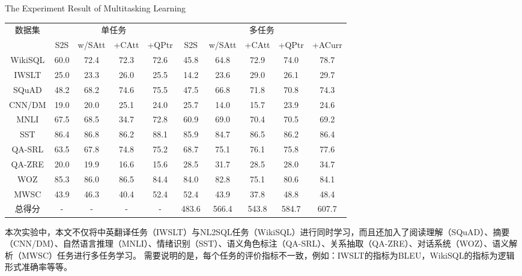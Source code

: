\begin{table}[!htpb]
    {The Experiment Result of Multitasking Learning}
  \label{tab:drwwldsyjg}
  \centering
  \begin{threeparttable}[b]
     \begin{tabular}{cccccccccc}
      \toprule
      \multirow{2}{18mm}{数据集}&\multicolumn{4}{c}{单任务} & \multicolumn{5}{c}{多任务}\\
      \cmidrule(lr){2-5}\cmidrule(lr){6-10}
      & S2S & w/SAtt & +CAtt & +QPtr & S2S & w/SAtt & +CAtt & +QPtr & +ACurr\\
      \midrule
      WikiSQL & 60.0 & 72.4 & 72.3 & 72.6 & 45.8 & 64.8 & 72.9 & 74.0 & 78.7\\
      IWSLT & 25.0 & 23.3 & 26.0 & 25.5 & 14.2 & 23.6 & 29.0 & 26.1 & 29.7\\
      SQuAD & 48.2 & 68.2 & 74.6 & 75.5 & 47.5 & 66.8 & 71.8 & 70.8 & 74.3\\
      CNN/DM & 19.0 & 20.0 & 25.1 & 24.0 & 25.7 & 14.0 & 15.7 & 23.9 & 24.6\\
      MNLI & 67.5 & 68.5 & 34.7 & 72.8 & 60.9 & 69.0 & 70.4 & 70.5 & 69.2\\
      SST & 86.4 & 86.8 & 86.2 & 88.1 & 85.9 & 84.7 & 86.5 & 86.2 & 86.4\\
      QA-SRL & 63.5 & 67.8 & 74.8 & 75.2 & 68.7 & 75.1 & 76.1 & 75.8 & 77.6\\
      QA-ZRE & 20.0 & 19.9 & 16.6 & 15.6 & 28.5 & 31.7 & 28.5 & 28.0 & 34.7\\
      WOZ & 85.3 & 86.0 & 86.5 & 84.4 & 84.0 & 82.8 & 75.1 & 80.6 & 84.1\\
      MWSC & 43.9 & 46.3 & 40.4 & 52.4 & 52.4 & 43.9 & 37.8 & 48.8 & 48.4\\
      \midrule
      总得分 & - & - & - & - & 483.6 & 566.4 & 543.8 & 584.7 & 607.7\\
      \bottomrule
    \end{tabular}
  \end{threeparttable}
\end{table}

本次实验中，本文不仅将中英翻译任务（IWSLT）与NL2SQL任务（WikiSQL）进行同时学习，而且还加入了阅读理解（SQuAD）、摘要（CNN/DM）、自然语言推理（MNLI）、情绪识别（SST）、语义角色标注（QA-SRL）、关系抽取（QA-ZRE）、对话系统（WOZ）、语义解析（MWSC）任务进行多任务学习。
需要说明的是，每个任务的评价指标不一致，例如：IWSLT的指标为BLEU，WikiSQL的指标为逻辑形式准确率等等。

